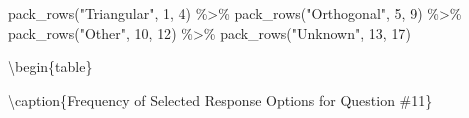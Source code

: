\documentclass[
  letterpaper,
  DIV=11,
  numbers=noendperiod]{scrreprt}
\newenvironment{Shaded}{\begin{snugshade}}{\end{snugshade}}
\newcommand{\DecValTok}[1]{\textcolor[rgb]{0.68,0.00,0.00}{#1}}
\newcommand{\FunctionTok}[1]{\textcolor[rgb]{0.28,0.35,0.67}{#1}}
\newcommand{\NormalTok}[1]{\textcolor[rgb]{0.00,0.23,0.31}{#1}}
\newcommand{\SpecialCharTok}[1]{\textcolor[rgb]{0.37,0.37,0.37}{#1}}
\newcommand{\StringTok}[1]{\textcolor[rgb]{0.13,0.47,0.30}{#1}}
\begin{document}
\begin{Shaded}
\begin{Highlighting}[]
  \FunctionTok{pack\_rows}\NormalTok{(}\StringTok{"Triangular"}\NormalTok{, }\DecValTok{1}\NormalTok{, }\DecValTok{4}\NormalTok{) }\SpecialCharTok{\%\textgreater{}\%}
  \FunctionTok{pack\_rows}\NormalTok{(}\StringTok{"Orthogonal"}\NormalTok{, }\DecValTok{5}\NormalTok{, }\DecValTok{9}\NormalTok{) }\SpecialCharTok{\%\textgreater{}\%}
  \FunctionTok{pack\_rows}\NormalTok{(}\StringTok{"Other"}\NormalTok{, }\DecValTok{10}\NormalTok{, }\DecValTok{12}\NormalTok{) }\SpecialCharTok{\%\textgreater{}\%}
  \FunctionTok{pack\_rows}\NormalTok{(}\StringTok{"Unknown"}\NormalTok{, }\DecValTok{13}\NormalTok{, }\DecValTok{17}\NormalTok{)}
\end{Highlighting}
\end{Shaded}

\textbackslash begin\{table\}

\textbackslash caption\{\label{tab:Q11-RESPONSES}Frequency of Selected
Response Options for Question \#11\} \centering
\end{document}
